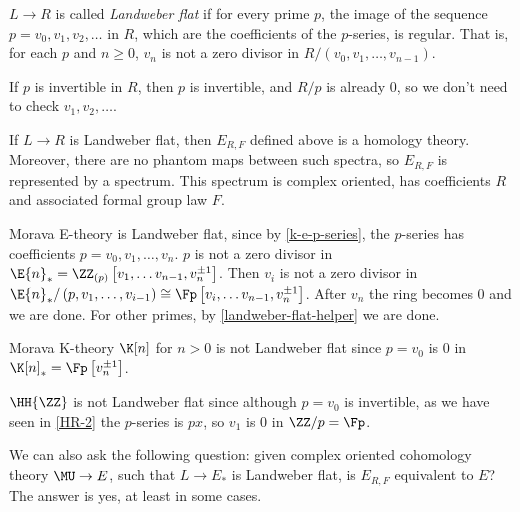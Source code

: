 \begin{definition}
	$L \to R$ is called \emph{Landweber flat} if for every prime $p$, the image of the sequence $p = v_0, v_1, v_2, \dotsc$ in $R$, which are the coefficients of the $p$-series, is regular.
	That is, for each $p$ and $n \geq 0$, $v_n$ is not a zero divisor in $R/\left(v_0, v_1, \dotsc, v_{n-1}\right)$.
\end{definition}

\begin{remark}\label{landweber-flat-helper}
	If $p$ is invertible in $R$, then $p$ is invertible, and $R/p$ is already $0$, so we don't need to check $v_1, v_2, \dotsc$.
\end{remark}

\begin{theorem}\label{LEFT}
	If $L \to R$ is Landweber flat, then $E_{R,F}$ defined above is a homology theory.
	Moreover, there are no phantom maps between such spectra, so $E_{R,F}$ is represented by a spectrum.
	This spectrum is complex oriented, has coefficients $R$ and associated formal group law $F$.
\end{theorem}

\begin{example}
	Morava E-theory is Landweber flat, since by \ref{k-e-p-series}, the $p$-series has coefficients $p = v_0, v_1, \dotsc, v_n$.
	$p$ is not a zero divisor in $\E{n}_* = \ZZ_{\left(p\right)}\left[v_1, \dotsc v_{n-1}, v_n^{\pm 1}\right]$.
	Then $v_i$ is not a zero divisor in $\E{n}_*/\left(p, v_1, \dotsc, v_{i-1}\right) \cong \Fp\left[v_i, \dotsc v_{n-1}, v_n^{\pm 1}\right]$.
	After $v_n$ the ring becomes $0$ and we are done.
	For other primes, by \ref{landweber-flat-helper} we are done.
\end{example}

\begin{example}
	Morava K-theory $\K[n]$ for $n > 0$ is not Landweber flat since $p = v_0$ is $0$ in $\K[n]_* = \Fp\left[v_n^{\pm 1}\right]$.
\end{example}

\begin{example}
	$\HH{\ZZ}$ is not Landweber flat since although $p = v_0$ is invertible, as we have seen in \ref{HR-2} the $p$-series is $px$, so $v_1$ is $0$ in $\ZZ/p = \Fp$.
\end{example}

We can also ask the following question: given complex oriented cohomology theory $\MU \to E$, such that $L \to E_*$ is Landweber flat, is $E_{R,F}$ equivalent to $E$?
The answer is yes, at least in some cases.

